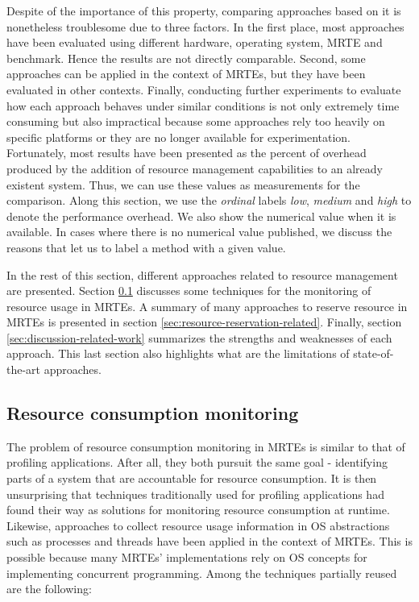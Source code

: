 \begin{itemize}
Despite of the importance of this property, comparing approaches based on it is nonetheless troublesome due to three factors.
In the first place, most approaches have been evaluated using different hardware, operating system, MRTE and benchmark.
Hence the results are not directly comparable.  
Second, some approaches can be applied in the context of MRTEs, but they have been evaluated in other contexts.
Finally, conducting further experiments to evaluate how each approach behaves under similar conditions is not only extremely time consuming but also impractical because some approaches rely too heavily on specific platforms or they are no longer available for experimentation.
Fortunately, most results have been presented as the percent of overhead produced by the addition of resource management capabilities to an already existent system.
Thus, we can use these values as measurements for the comparison.
Along this section, we use the \textit{ordinal} labels \textit{low}, \textit{medium} and \textit{high} to denote the performance overhead.
We also show the numerical value when it is available.
In cases where there is no numerical value published, we discuss the reasons that let us to label a method with a given value.
\end{itemize}

In the rest of this section, different approaches related to resource management are presented.
Section \ref{sec:resource-consumption-monitoring-related} discusses some techniques for the monitoring of resource usage in MRTEs.
A summary of many approaches to reserve resource in MRTEs is presented in section \ref{sec:resource-reservation-related}.
Finally, section \ref{sec:discussion-related-work} summarizes the strengths and weaknesses of each approach.
This last section also highlights what are the limitations of state-of-the-art approaches.

\subsection{Resource consumption monitoring} \label{sec:resource-consumption-monitoring-related}

The problem of resource consumption monitoring in MRTEs is similar to that of profiling applications.
After all, they both pursuit the same goal - identifying parts of a system that are accountable for resource consumption.
It is then unsurprising that techniques traditionally used for profiling applications had found their way as solutions for monitoring resource consumption at runtime.
Likewise, approaches to collect resource usage information in OS abstractions such as processes and threads have been applied in the context of MRTEs.
This is possible because many MRTEs' implementations rely on OS concepts for implementing concurrent programming.
Among the techniques partially reused are the following:

